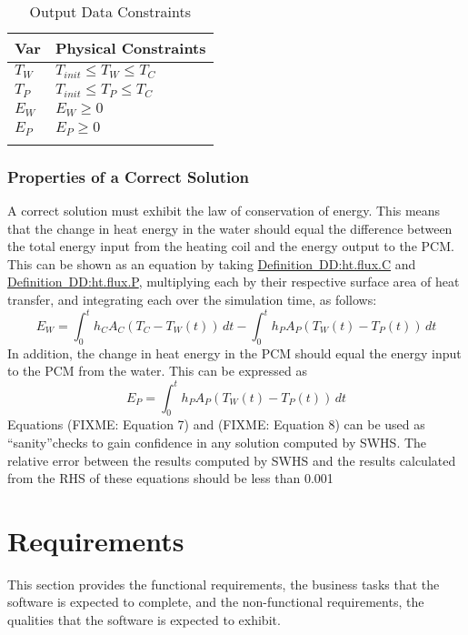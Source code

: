 \documentclass[12pt]{article}
\begin{document}
\begin{longtable}{l l}
\toprule
Var & Physical Constraints
\\
\midrule
${T_{W}}$ & ${T_{init}}\leq{}{T_{W}}\leq{}{T_{C}}$
\\
${T_{P}}$ & ${T_{init}}\leq{}{T_{P}}\leq{}{T_{C}}$
\\
${E_{W}}$ & ${E_{W}}\geq{}0$
\\
${E_{P}}$ & ${E_{P}}\geq{}0$
\\
\bottomrule
\caption{Output Data Constraints}
\label{Table:OutDataConstraints}
\end{longtable}
\subsubsection{Properties of a Correct Solution}
\label{Sec:CorSolProps}
A correct solution must exhibit the law of conservation of energy. This means that the change in heat energy in the water should equal the difference between the total energy input from the heating coil and the energy output to the PCM. This can be shown as an equation by taking \hyperref[DD:ht.flux.C]{Definition~DD:ht.flux.C} and \hyperref[DD:ht.flux.P]{Definition~DD:ht.flux.P}, multiplying each by their respective surface area of heat transfer, and integrating each over the simulation time, as follows:
\begin{dmath}
{E_{W}}=\int_{0}^{t}{{h_{C}} {A_{C}} \left({T_{C}}-{T_{W}}\left(t\right)\right)}\,dt-\int_{0}^{t}{{h_{P}} {A_{P}} \left({T_{W}}\left(t\right)-{T_{P}}\left(t\right)\right)}\,dt
\end{dmath}
In addition, the change in heat energy in the PCM should equal the energy input to the PCM from the water. This can be expressed as
\begin{dmath}
{E_{P}}=\int_{0}^{t}{{h_{P}} {A_{P}} \left({T_{W}}\left(t\right)-{T_{P}}\left(t\right)\right)}\,dt
\end{dmath}
Equations (FIXME: Equation 7) and (FIXME: Equation 8) can be used as ``sanity''checks to gain confidence in any solution computed by SWHS. The relative error between the results computed by SWHS and the results calculated from the RHS of these equations should be less than 0.001%
\section{Requirements}
\label{Sec:Requirements}
This section provides the functional requirements, the business tasks that the software is expected to complete, and the non-functional requirements, the qualities that the software is expected to exhibit.
\end{document}
